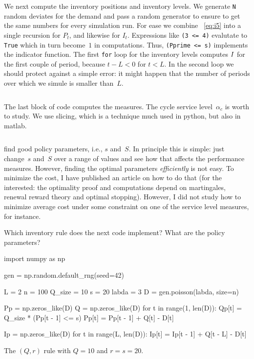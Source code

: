 \documentclass[stochastic-or.tex]{subfiles}
\begin{document}
We next compute the inventory positions and inventory levels.
We generate \texttt{N} random deviates for the demand and pass a random generator to ensure to get the same numbers for every simulation run.
For ease we combine ~\cref{eq:i5} into a single recursion for $P_t$, and likewise for $I_t$.
Expressions like \texttt{(3 <= 4)} evalutate to \texttt{True} which in turn become~$1$ in computations.
Thus, \texttt{(Pprime <= s)} implements the indicator function.
The first \texttt{for} loop for the inventory levels computes $I$ for the first couple of period, because $t-L< 0$ for $t< L$.
In the second loop we should protect against a simple error: it might happen that the number of periods over which we simule is smaller than~$L$.
\inputminted[firstline=23, lastline=40]{python}{../code/ss_inventory_simulation.py} %

The last block of code computes the measures.
The cycle service level~$\alpha_{c}$ is worth to study.
We use slicing, which is a technique  much used in python, but also in matlab.
\inputminted[firstline=44, lastline=57]{python}{../code/ss_inventory_simulation.py} %


 find good policy parameters, i.e., $s$ and~$S$.
In principle this is simple: just change~$s$ and~$S$ over a range of values and see how that affects the performance measures.
However, finding the optimal parameters \emph{efficiently} is not easy.
To minimize the cost, I have published an article on how to do that (for the interested: the optimality proof and computations depend on martingales, renewal reward theory and optimal stopping).
However, I did not study how to minimize average cost under some constraint on one of the service level measures, for instance.



\begin{exercise}
Which inventory rule does the next code implement? What are the policy parameters?
\begin{python}
import numpy as np

gen = np.random.default_rng(seed=42)

L = 2
n = 100
Q_size = 10
s = 20
labda = 3
D = gen.poisson(labda, size=n)

Pp = np.zeros_like(D)
Q = np.zeros_like(D)
for t in range(1, len(D)):
    Qp[t] = Q_size * (Pp[t - 1] <= s)
    Pp[t] = Pp[t - 1] + Q[t] - D[t]

Ip = np.zeros_like(D)
for t in range(L, len(D)):
    Ip[t] = Ip[t - 1] + Q[t - L] - D[t]
\end{python}
\begin{solution}
The $(Q,r)$ rule with $Q=10$ and $r=s=20$.
\end{solution}
\end{exercise}




\end{document}
